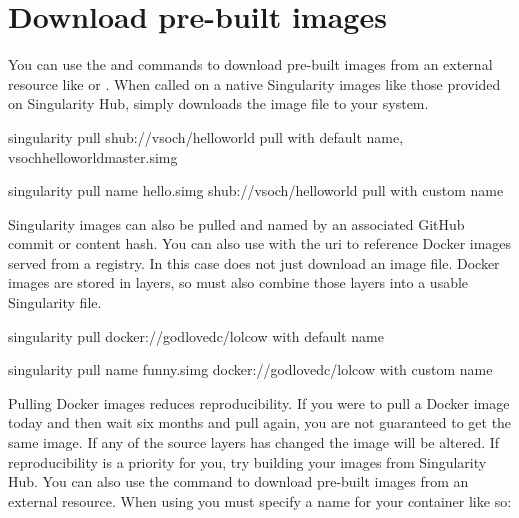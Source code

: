 \documentclass[letterpaper,10pt,english]{sphinxmanual}
\begin{document}
\section{Download pre-built images}
\label{\detokenize{quick_start:download-pre-built-images}}
You can use the {\hyperref[\detokenize{appendix:pull-command}]{}} and {\hyperref[\detokenize{appendix:build-command}]{}} commands to download pre-built images from an
external resource like  or . When called
on a native Singularity images like those provided on Singularity Hub, 
simply downloads the image file to your system.

%
\begin{sphinxVerbatim}[commandchars=\\\{\}]
\PYGZdl{} singularity pull shub://vsoch/hello\PYGZhy{}world   \PYGZsh{} pull with default name, vsoch\PYGZhy{}hello\PYGZhy{}world\PYGZhy{}master.simg

\PYGZdl{} singularity pull \PYGZhy{}\PYGZhy{}name hello.simg shub://vsoch/hello\PYGZhy{}world   \PYGZsh{} pull with custom name
\end{sphinxVerbatim}

Singularity images can also be pulled and named by an associated
GitHub commit or content hash.
You can also use  with the  uri to reference Docker images served from a
registry. In this case  does not just download an image file. Docker
images are stored in layers, so  must also combine those layers into a
usable Singularity file.

%
\begin{sphinxVerbatim}[commandchars=\\\{\}]
\PYGZdl{} singularity pull docker://godlovedc/lolcow  \PYGZsh{} with default name

\PYGZdl{} singularity pull \PYGZhy{}\PYGZhy{}name funny.simg docker://godlovedc/lolcow \PYGZsh{} with custom name
\end{sphinxVerbatim}

Pulling Docker images reduces reproducibility. If you were to pull a
Docker image today and then wait six months and pull again, you are
not guaranteed to get the same image. If any of the source layers has
changed the image will be altered. If reproducibility is a priority
for you, try building your images from Singularity Hub.
You can also use the  command to download pre-built images from an
external resource. When using  you must specify a name for your
container like so:
\end{document}
